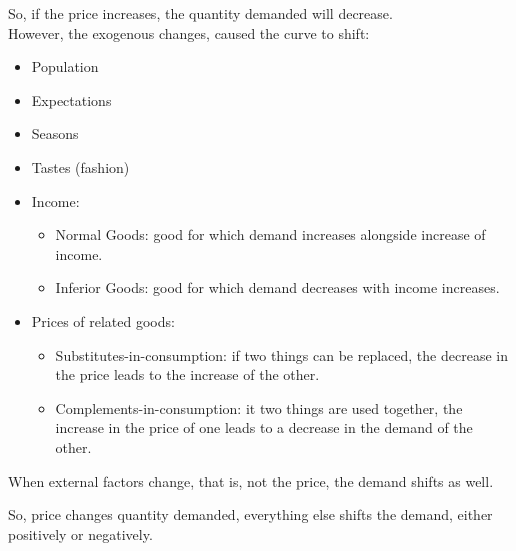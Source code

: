 \documentclass[nobib]{tufte-handout}
\begin{document}
So, if the price increases, the quantity demanded will decrease.\\
However, the exogenous changes, caused the curve to shift:
\begin{itemize}
    \item Population
    \item Expectations
    \item Seasons
    \item Tastes (fashion)
    \item Income:
          \begin{itemize}
              \item Normal Goods: good for which demand increases alongside increase of income.
              \item Inferior Goods: good for which demand decreases with income increases.
          \end{itemize}
    \item Prices of related goods:
          \begin{itemize}
              \item Substitutes-in-consumption: if two things can be replaced, the decrease in the
                    price leads to the increase of the other.
              \item Complements-in-consumption: it two things are used together, the increase in
                    the price of one leads to a decrease in the demand of the other.
          \end{itemize}
\end{itemize}
When external factors change, that is, not the price, the demand shifts as well.
\begin{center}
\end{center}
So, price changes quantity demanded, everything else shifts the demand, either positively or negatively.
\end{document}
